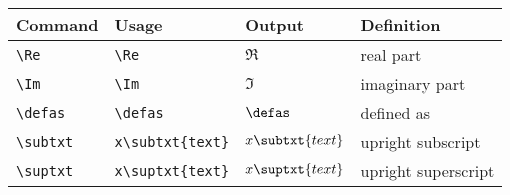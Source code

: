 \documentclass[11pt]{article}
\begin{document}
\begin{tabular}{llll}
    Command        & Usage                 & Output           & Definition          \\
    \hline
    \verb|\Re|     & \verb|\Re|            & $\Re$            & real part           \\
    \verb|\Im|     & \verb|\Im|            & $\Im$            & imaginary part      \\
    \verb|\defas|  & \verb|\defas|         & $\defas$         & defined as          \\
    \verb|\subtxt| & \verb|x\subtxt{text}| & $x\subtxt{text}$ & upright subscript   \\
    \verb|\suptxt| & \verb|x\suptxt{text}| & $x\suptxt{text}$ & upright superscript \\
\end{tabular}
\end{document}
